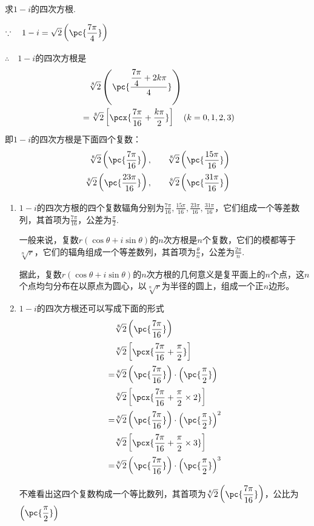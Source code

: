 \begin{example}
    求$1-i$的四次方根.
\end{example}

\begin{solution}
    $\because\quad 1-i=\sqrt{2}\left(\pc{\frac{7\pi}{4}}\right)$

$\therefore\quad 1-i$的四次方根是
\[\begin{split}
   &\quad  \sqrt[8]{2}\left(\pc{\frac{\frac{7\pi}{4}+2k\pi}{4}}\right)\\
    & =\sqrt[8]{2}\left[\pcx{\frac{7\pi}{16}+\frac{k\pi}{2}}\right]\quad (k=0,1,2,3)
\end{split}\]
即$1-i$的四次方根是下面四个复数：
\[\begin{split}
    \sqrt[8]{2}\left(\pc{\frac{7\pi}{16}}\right),&\qquad     \sqrt[8]{2}\left(\pc{\frac{15\pi}{16}}\right)\\
    \sqrt[8]{2}\left(\pc{\frac{23\pi}{16}}\right),&\qquad     \sqrt[8]{2}\left(\pc{\frac{31\pi}{16}}\right)
\end{split}\]
\end{solution}

\begin{note}
\begin{enumerate}[(1)]
    \item $1-i$的四次方根的四个复数辐角分别为$\frac{7\pi}{16},\frac{15\pi}{16},\frac{23\pi}{16},\frac{31\pi}{16}$，它们组成一个等差数列，其首项为$\frac{7\pi}{16}$，公差为$\frac{\pi}{2}$.
    
    一般来说，复数$r(\cos\theta+i\sin\theta)$的$n$次方根是$n$个复数，它们的模都等于$\sqrt[n]{r}$，它们的辐角组成一个等差数列，其首项为$\frac{\theta}{n}$，公差为$\frac{2\pi}{n}$.

    据此，复数$r(\cos\theta+i\sin\theta)$的$n$次方根的几何意义是复平面上的$n$个点，这$n$个点均匀分布在以原点为圆心，以$\sqrt[n]{r}$为半径的圆上，组成一个正$n$边形。
    \item $1-i$的四次方根还可以写成下面的形式
\[\begin{split}
    &\sqrt[8]{2}\left(\pc{\frac{7\pi}{16}}\right)\\
    &\sqrt[8]{2}\left[\pcx{\frac{7\pi}{16}+\frac{\pi}{2}}\right]\\
    =&\sqrt[8]{2}\left(\pc{\frac{7\pi}{16}}\right)\cdot \left(\pc{\frac{\pi}{2}}\right)\\
    &\sqrt[8]{2}\left[\pcx{\frac{7\pi}{16}+\frac{\pi}{2}\x 2}\right]\\
    =&\sqrt[8]{2}\left(\pc{\frac{7\pi}{16}}\right)\cdot \left(\pc{\frac{\pi}{2}}\right)^2\\
    &\sqrt[8]{2}\left[\pcx{\frac{7\pi}{16}+\frac{\pi}{2}\x 3}\right]\\
    =&\sqrt[8]{2}\left(\pc{\frac{7\pi}{16}}\right)\cdot \left(\pc{\frac{\pi}{2}}\right)^3\\
\end{split}\]

不难看出这四个复数构成一个等比数列，其首项为$\sqrt[8]{2}\left(\pc{\frac{7\pi}{16}}\right)$，公比为$\left(\pc{\frac{\pi}{2}}\right)$
\end{enumerate}
\end{note}

